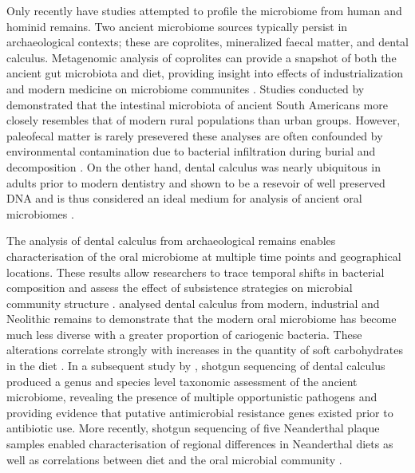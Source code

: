 \documentclass[12pt, a4paper]{article}
\begin{document}
Only recently have studies attempted to profile the microbiome from human and hominid remains. 
Two ancient microbiome sources typically persist in archaeological contexts; these are coprolites, mineralized faecal matter, and dental calculus.
Metagenomic analysis of coprolites can provide a snapshot of both the ancient gut microbiota and diet, providing insight into effects of industrialization and modern medicine on microbiome communites \cite{Tito:2008aa}. 
Studies conducted by  demonstrated that the intestinal microbiota of ancient South Americans more closely resembles that of modern rural populations than urban groups. 
However, paleofecal matter is rarely presevered these analyses are often confounded by environmental contamination due to bacterial infiltration during burial and decomposition \cite{Tito:2012aa}.  
On the other hand, dental calculus was nearly ubiquitous in adults prior to modern dentistry \cite{White:1997} and shown to be a resevoir of well preserved DNA and is thus considered an ideal medium for analysis of ancient oral microbiomes \cite{Warinner:2014aa,Weyrich:2015aa}. 

The analysis of dental calculus from archaeological remains enables characterisation of the oral microbiome at multiple time points and geographical locations. These results allow researchers to trace temporal shifts in bacterial composition and assess the effect of subsistence strategies on microbial community structure \cite{Weyrich:2015aa}.
 analysed dental calculus from modern, industrial and Neolithic remains to demonstrate that the modern oral microbiome has become much less diverse with a greater proportion of cariogenic bacteria. 
These alterations correlate strongly with increases in the quantity of soft carbohydrates in the diet \cite{Adler:2013aa} .
In a subsequent study by , shotgun sequencing of dental calculus produced a genus and species level taxonomic assessment of the ancient microbiome, revealing the presence of multiple opportunistic pathogens and providing evidence that putative antimicrobial resistance genes existed prior to antibiotic use. 
More recently, shotgun sequencing of five Neanderthal plaque samples enabled characterisation of regional differences in Neanderthal diets as well as correlations between diet and the oral microbial community \cite{Weyrich:2017aa}.
\end{document}
